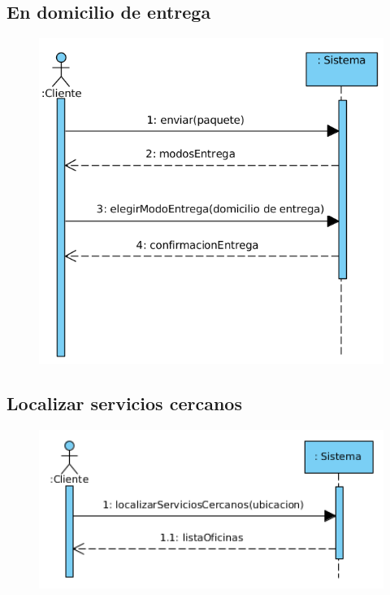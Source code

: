 \subsection{En domicilio de entrega}
\begin{figure}[H]
	\centering
	\includegraphics[width=16cm]{49}
\end{figure}
\subsection{Localizar servicios cercanos}
\begin{figure}[H]
	\centering
	\includegraphics[width=16cm]{50}
\end{figure}
